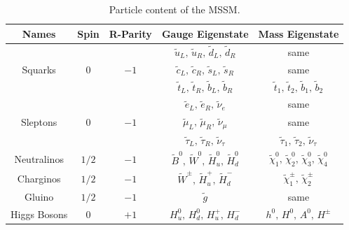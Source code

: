 \begin{table}[!htb]
    \begin{center}
        \caption{
            Particle content of the MSSM.
        }
        \label{tab:mssm_particles}
        \begin{tabular}{c | c | c | c | c}
        \hline
        \hline
            \textbf{Names} & \textbf{Spin} & \textbf{R-Parity} & \textbf{Gauge Eigenstate} & \textbf{Mass Eigenstate} \\
            \hline
            \multirow{3}{*}{Squarks} & \multirow{3}{*}{0} & \multirow{3}{*}{$-1$} & $\tilde{u}_L, \,\tilde{u}_R, \, \tilde{d}_L, \, \tilde{d}_R$ & same  \\
                                                & & & $\tilde{c}_L, \,\tilde{c}_R, \, \tilde{s}_L, \, \tilde{s}_R$ & same  \\
                                                & & & $\tilde{t}_L, \,\tilde{t}_R, \, \tilde{b}_L, \, \tilde{b}_R$ & $\tilde{t}_1,\,\tilde{t}_2,\,\tilde{b}_1,\,\tilde{b}_2$  \\
            \hline
            \multirow{3}{*}{Sleptons} & \multirow{3}{*}{0} & \multirow{3}{*}{$-1$} & $\tilde{e}_L,\,\tilde{e}_R,\,\tilde{\nu}_e$ & same \\
                & & & $\tilde{\mu}_L,\,\tilde{\mu}_R,\,\tilde{\nu}_{\mu}$ & same \\
                & & & $\tilde{\tau}_L,\,\tilde{\tau}_R,\,\tilde{\nu}_{\tau}$ & $\tilde{\tau}_1,\,\tilde{\tau}_2,\,\tilde{\nu}_{\tau}$ \\
            \hline
            Neutralinos & $1/2$ & $-1$ & $\tilde{B}^0,\,\tilde{W}^0,\,\tilde{H}^0_u,\,\tilde{H}^0_d$ & $\tilde{\chi}^0_1,\,\tilde{\chi}^0_2,\,\tilde{\chi}^0_3,\,\tilde{\chi}^0_4$ \\
            \hline
            Charginos & $1/2$ & $-1$ & $\tilde{W}^{\pm},\,\tilde{H}^+_u,\,\tilde{H}^-_d$ & $\tilde{\chi}^{\pm}_1,\,\tilde{\chi}^{\pm}_2$ \\
            \hline
            Gluino & $1/2$ & $-1$ & $\tilde{g}$ & same \\
            \hline
            \hline
            Higgs Bosons & 0 & $+1$ & $H_u^0,\,H_d^0,\,H_u^+,\,H_d^-$ & $h^0,\,H^0,\,A^0,\,H^{\pm}$  \\
        \hline
        \hline
        \end{tabular}
    \end{center}
\end{table}

